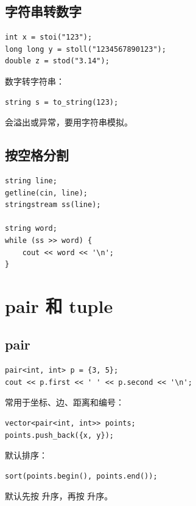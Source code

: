 \subsection{字符串转数字}

\begin{lstlisting}
int x = stoi("123");
long long y = stoll("1234567890123");
double z = stod("3.14");
\end{lstlisting}

数字转字符串：

\begin{lstlisting}
string s = to_string(123);
\end{lstlisting}

 会溢出或异常，要用字符串模拟。

\subsection{按空格分割}

\begin{lstlisting}
string line;
getline(cin, line);
stringstream ss(line);

string word;
while (ss >> word) {
    cout << word << '\n';
}
\end{lstlisting}

\section{pair 和 tuple}\label{sec:04-13}

\subsection{pair}

\begin{lstlisting}
pair<int, int> p = {3, 5};
cout << p.first << ' ' << p.second << '\n';
\end{lstlisting}

常用于坐标、边、距离和编号：

\begin{lstlisting}
vector<pair<int, int>> points;
points.push_back({x, y});
\end{lstlisting}

默认排序：

\begin{lstlisting}
sort(points.begin(), points.end());
\end{lstlisting}

默认先按  升序，再按  升序。

